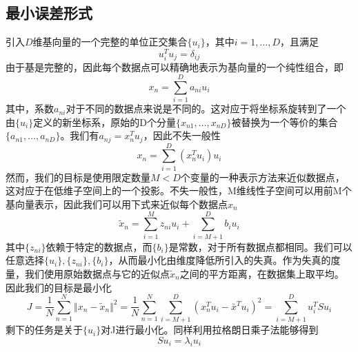 \subsection*{最小误差形式}
引入$D$维基向量的一个完整的单位正交集合$\{u_i\}$，其中$i=1,\dots,D$，且满足 
\begin{equation}
	u_i^Tu_j=\delta_{ij}
\end{equation}
由于基是完整的，因此每个数据点可以精确地表示为基向量的一个纯性组合，即
\begin{equation}
	x_n=\sum_{i=1}^{D}a_{ni}u_i
\end{equation}
其中，系数$a_{ni}$对于不同的数据点来说是不同的。这对应于将坐标系旋转到了一个由$\{u_i\}$定义的新坐标系，原始的D个分量$\{x_{n1},\dots,x_{nD}\}$被替换为一个等价的集合$\{a_{n1},\dots,a_{nD}\}$。我们有$a_{nj}=x_n^Tu_j$，因此不失一般性
\begin{equation}
	x_n=\sum_{i=1}^{D}(x_n^Tu_i)u_i
\end{equation}
然而，我们的目标是使用限定数量$M<D$个变量的一种表示方法来近似数据点，这对应于在低维子空间上的一个投影。不失一般性，M维线性子空间可以用前M个基向量表示，因此我们可以用下式来近似每个数据点$x_n$
\begin{equation}
	\widetilde{x}_n=\sum_{i=1}^{M}z_{ni}u_i+\sum_{i=M+1}^{D}b_iu_i
\end{equation}
其中$\{z_{ni}\}$依赖于特定的数据点，而$\{b_i\}$是常数，对于所有数据点都相同。我们可以任意选择$\{u_i\},\{z_{ni}\},\{b_i\}$，从而最小化由维度降低所引入的失真。作为失真的度量，我们使用原始数据点与它的近似点$\widetilde{x}_n$之间的平方距离，在数据集上取平均。因此我们的目标是最小化
\begin{equation}
	J=\frac{1}{N}\sum_{n=1}^{N}\Vert x_n -\widetilde{x}_n \Vert^2=\frac{1}{N}\sum_{n=1}^{N}\sum_{i=M+1}^{D}(x_n^Tu_i-\bar{x}^Tu_i)^2=\sum_{i=M+1}^{D}u_i^TSu_i
\end{equation}
剩下的任务是关于$\{u_i\}$对J进行最小化。同样利用拉格朗日乘子法能够得到 
\begin{equation}
	Su_i=\lambda_iu_i
\end{equation}
